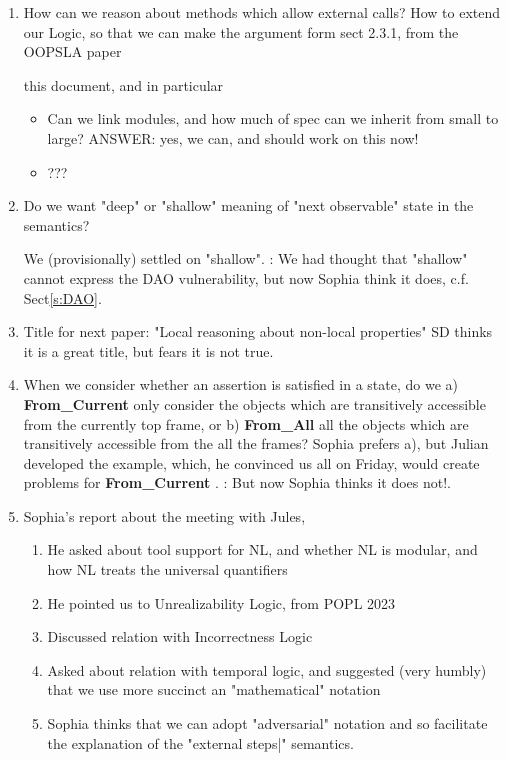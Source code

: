 \documentclass[11pt]{article} %
\theoremstyle{definition}
\begin{document}
\begin{enumerate}
\item
How can we reason about methods which allow external calls? 
How to extend our Logic, so that we can make the argument form sect 2.3.1, from the OOPSLA paper


this document, and in particular

\begin{itemize}
\item
Can we link  modules, and how much of spec can we inherit  from small to large? ANSWER: yes, we can, and should work on this now!
\item 
???
\end{itemize}

\item
Do we want "deep" or "shallow" meaning of "next observable" state in the semantics?

We (provisionally) settled on "shallow". \SP: We had thought that "shallow" cannot express the DAO vulnerability, but now Sophia think it does, c.f. Sect\ref{s:DAO}.

\item
Title for next paper: "Local reasoning about non-local properties" SD thinks it is a great title, but fears it is not true.

\item
When we consider whether an assertion is satisfied in a state, do we a) \textbf{From\_Current} only consider the objects which are transitively accessible from the currently top frame, or b)  \textbf{From\_All} all the objects which are transitively accessible from the all the frames? Sophia prefers a), but Julian developed the  example, which, he convinced us all on Friday, would create problems for  \textbf{From\_Current} . \SP: But now Sophia thinks it does not!.
\item
Sophia's report about the meeting with Jules, 
\begin{enumerate}
\item 
He asked about tool support for NL, and whether NL is modular, and how NL treats the universal quantifiers 
\item
He pointed us to Unrealizability  Logic, from POPL 2023
\item
Discussed relation with Incorrectness Logic
\item
Asked about relation with temporal logic, and suggested (very humbly) that we use more succinct an "mathematical" notation
\item
Sophia thinks that we can adopt "adversarial" notation and so facilitate the explanation of the "external steps|" semantics.
\end{enumerate}
\end{enumerate}
\end{document}
